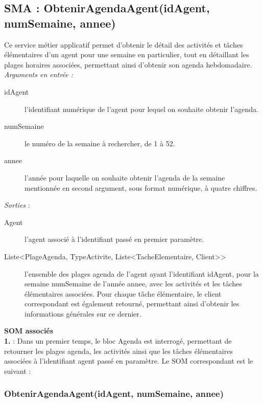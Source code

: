 \subsection{SMA : ObtenirAgendaAgent(idAgent, numSemaine, annee)}

Ce service métier applicatif permet d'obtenir le détail des activités et tâches élémentaires d'un agent pour une semaine en particulier, tout en détaillant les plages horaires associées, permettant ainsi d'obtenir son agenda hebdomadaire. \\

\noindent \textit{\textit{Arguments en entrée :}}
\begin{description}
\item[idAgent] l'identifiant numérique de  l'agent pour lequel on souhaite obtenir l'agenda. 
\item[numSemaine] le numéro de la semaine à rechercher, de 1 à 52. 
\item[annee] l'année pour laquelle on souhaite obtenir l'agenda de la semaine mentionnée en second argument, sous format numérique, à quatre chiffres. \\
\end{description}

\noindent \textit{Sorties} :

\begin{description}
\item[Agent] l'agent associé à l'identifiant passé en premier paramètre.
\item[Liste<PlageAgenda, TypeActivite, Liste<TacheElementaire, Client>>] l'ensemble des plages agenda de l'agent ayant l'identifiant idAgent, pour la semaine numSemaine de l'année annee, avec les activités et les tâches élémentaires associées. Pour chaque tâche élémentaire, le client correspondant est également retourné, permettant ainsi d'obtenir les informations générales sur ce dernier. \\
\end{description}

\begin{shaded}
\textbf{SOM associés}\\
\textbf{1.} : Dans un premier temps, le bloc Agenda est interrogé, permettant de retourner les plages agenda, les activités ainsi que les tâches élémentaires associées à l'identifiant agent passé en paramètre. Le SOM correspondant est le suivant : 
\end{shaded}

\subsubsection{ObtenirAgendaAgent(idAgent, numSemaine, annee)}

